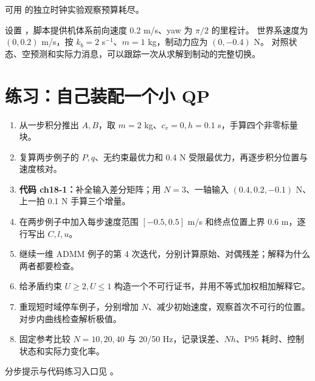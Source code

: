 可用  的独立时钟实验观察预算耗尽。

设置 ，脚本提供机体系前向速度 0.2 m/s、yaw 为 $\pi/2$ 的里程计。
世界系速度为 $(0,0.2)$ m/s，按 $k_b=2$ s$^{-1}$、$m=1$ kg，制动力应为 $(0,-0.4)$ N。
对照状态、空预测和实际力消息，可以跟踪一次从求解到制动的完整切换。

\section{练习：自己装配一个小 QP}
\begin{enumerate}
\item 从一步积分推出 $A,B$，取 $m=2$ kg、$c_v=0,h=0.1$ s，手算四个非零标量块。
\item 复算两步例子的 $P,q$、无约束最优力和 0.4 N 受限最优力，再逐步积分位置与速度核对。
\item \textbf{代码 ch18-1：}补全输入差分矩阵；用 $N=3$、一轴输入 $(0.4,0.2,-0.1)$ N、上一拍 0.1 N 手算三个增量。
\item 在两步例子中加入每步速度范围 $[-0.5,0.5]$ m/s 和终点位置上界 0.6 m，逐行写出 $C,l,u$。
\item 继续一维 ADMM 例子的第 4 次迭代，分别计算原始、对偶残差；解释为什么两者都要检查。
\item 给矛盾约束 $U\geq2,U\leq1$ 构造一个不可行证书，并用不等式加权相加解释它。
\item 重现短时域停车例子，分别增加 $N$、减少初始速度，观察首次不可行的位置。对步内曲线检查解析极值。
\item 固定参考比较 $N=10,20,40$ 与 20/50 Hz，记录误差、$Nh$、P95 耗时、控制状态和实际力变化率。
\end{enumerate}
分步提示与代码练习入口见 。
